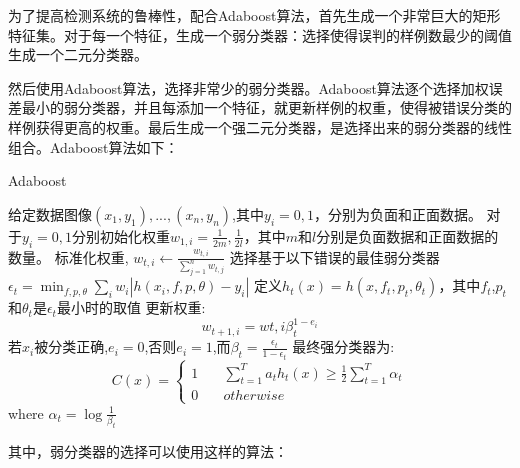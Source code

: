 为了提高检测系统的鲁棒性，配合Adaboost\cite{boosting}算法，首先生成一个非常巨大的矩形特征集。对于每一个特征，生成一个弱分类器：选择使得误判的样例数最少的阈值生成一个二元分类器。


然后使用Adaboost算法，选择非常少的弱分类器。Adaboost算法逐个选择加权误差最小的弱分类器，并且每添加一个特征，就更新样例的权重，使得被错误分类的样例获得更高的权重。最后生成一个强二元分类器，是选择出来的弱分类器的线性组合。Adaboost算法如下：
\begin{algorithm}
    \caption{Adaboost}
    \begin{algorithmic}[1] 
    \State 给定数据图像$(x_1,y_1),...,(x_n,y_n)$,其中$y_i=0,1$，分别为负面和正面数据。
    \State 对于${y_i=0,1}$分别初始化权重$w_{1,i}=\frac{1}{2m},\frac{1}{2l}$，其中$m$和$l$分别是负面数据和正面数据的数量。
    \State 标准化权重, $w_{t,i}\leftarrow \frac{w_{t,i}}{\sum_{j=1}^nw_{t,j}}$
    \State 选择基于以下错误的最佳弱分类器$\epsilon_t=\min_{f,p,\theta}\sum_iw_i|h(x_i,f,p,\theta)-y_i|$
    \State 定义$h_t(x)=h(x,f_t,p_t,\theta_t)$，其中$f_t$,$p_t$和$\theta_t$是$\epsilon_t$最小时的取值
    \State 更新权重:
    $$w_{t+1,i}=w{t,i}\beta_t^{1-e_i}$$
    若$x_i$被分类正确,$e_i=0$,否则$e_i=1$,而$\beta_t=\frac{\epsilon_t}{1-\epsilon_t}$
    \EndFor
    \State 最终强分类器为:
    $$C(x)=\left\{
        \begin{aligned}
            1 \quad & \sum_{t=1}^Ta_th_t(x)\geq \frac{1}{2}\sum_{t=1}^T\alpha_t\\
            0 \quad & otherwise
        \end{aligned}
        \right.
    $$
    where $\alpha_t=\log\frac{1}{\beta_t}$
    \end{algorithmic}
\end{algorithm}
其中，弱分类器的选择可以使用这样的算法：

